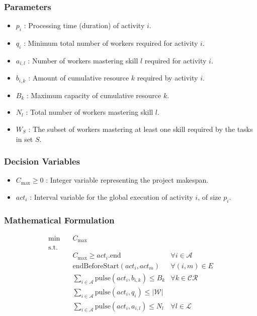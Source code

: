 \documentclass[preprint, authoryear,11pt]{elsarticle}
\begin{document}
\subsubsection{Parameters}
\begin{itemize}
    \item $p_i$ : Processing time (duration) of activity $i$.
    \item $q_i$ : Minimum total number of workers required for activity $i$.
    \item $a_{i,l}$ : Number of workers mastering skill $l$ required for activity $i$.
    \item $b_{i,k}$ : Amount of cumulative resource $k$ required by activity $i$.
    \item $B_k$ : Maximum capacity of cumulative resource $k$.
    \item $N_l$ : Total number of workers mastering skill $l$.
    \item $W_S$ : The subset of workers mastering at least one skill required by the tasks in set $S$.
\end{itemize}

\subsubsection{Decision Variables}
\begin{itemize}
    \item $C_{\max} \ge 0$ : Integer variable representing the project makespan.
    \item $act_i$ : Interval variable for the global execution of activity $i$, of size $p_i$.
\end{itemize}


\subsubsection{Mathematical Formulation}
\begin{align}
    \min \quad & C_{\max} \label{mp_obj} \\
    \text{s.t.} \quad & \nonumber \\
    & C_{\max} \geq act_i.\text{end} & \forall i \in \mathcal{A} \label{mp_makespan} \\
    & \text{endBeforeStart}(act_i, act_m) & \forall (i,m) \in E \label{mp_prec} \\
    & \sum_{i \in \mathcal{A}} \text{pulse}(act_i, b_{i,k}) \leq B_k & \forall k \in \mathcal{CR} \label{mp_cumul} \\
    &\sum_{i \in \mathcal{A}} \text{pulse}(act_i, q_i) \leq \lvert \mathcal{W} \rvert \label{mp_relax_w} \\
    & \sum_{i \in \mathcal{A}}  \text{pulse}(act_i, a_{i,l}) \leq N_{l} & \forall l \in \mathcal{L} \label{mp_relax_s} 
\end{align}
\end{document}
